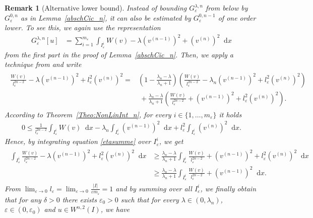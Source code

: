 \documentclass{article}
\newcommand{\dd}{\mathop{}\mathrm{d}} %
\newcommand{\lam}{\lambda}
\newcommand{\eps}{\varepsilon}
\numberwithin{figure}{section}
\newtheorem{rem}[theorem]{Remark}
\numberwithin{equation}{section}
\begin{document}
\begin{rem}[Alternative lower bound]
Instead of bounding $G^{\lam,n}_\eps$ from below by $G^{0,n}_\eps$ as in Lemma~\ref{abschCic_n}, it can also be estimated by $G^{0,n-1}_\eps$ of one order lower. To see this, we again use the representation
    \begin{align}
         G_\eps^{\lam,n}[u] & = \sum_{i=1}^{m_\eps} \int_{I_\eps^i}W(v) - \lam (v^{(n-1)})^2 + (v^{(n)})^2\dd x
    \end{align}
from the first part in the proof of Lemma~\ref{abschCic_n}. Then, we apply a technique from \cite[Section~4]{CheDalFonLeo} and write
    \begin{align} \label{etasumme}
    \begin{split}
        \frac{W(v)}{l_\eps^{2n-2}} - \lam(v^{(n-1)})^2+ l_\eps^2(v^{(n)})^2 = & \left(1-\frac{\lam_n-\lam}{\lam_n+1}\right) \! \left(\frac{W(v)}{l_\eps^{2n-2}}-\lam_n(v^{(n-1)})^2+l_\eps^2(v^{(n)})^2\right)\\
        &\ + \frac{\lam_n-\lam}{\lam_n+1} \left(\frac{W(v)}{l_\eps^{2n-2}} + (v^{(n-1)})^2+l_\eps^2(v^{(n)})^2\right).
    \end{split}
    \end{align}
According to Theorem~\ref{Theo:NonLinInt_n}, for every $i \in \{1,\ldots,m_\eps\}$ it holds
    \begin{align}
        0 \leq \frac{1}{l_\eps^{2n-2}} \int_{I_\eps^i} W(v)\dd x - \lam_n \int_{I_\eps^i} (v^{(n-1)})^2\dd x + l_\eps^2 \int_{I_\eps^i} (v^{(n)})^2\dd x.
    \end{align}
Hence, by integrating equation \eqref{etasumme} over $I_\eps^i$, we get
    \begin{align}
    \begin{split}
        \int_{I_\eps^i} \frac{W(v)}{l_\eps^{2n-2}} -\lam(v^{(n-1)})^2+ l_\eps^2 (v^{(n)})^2 \dd x 
        & \geq \frac{\lam_n-\lam}{\lam_n+1} \int_{I_\eps^i} \frac{W(v)}{l_\eps^{2n-2}} +(v^{(n-1)})^2+ l_\eps^2 (v^{(n)})^2\dd x \\
        &\geq \frac{\lam_n-\lam}{\lam_n+1} \int_{I_\eps^i} \frac{W(v)}{l_\eps^{2n-2}} + (v^{(n-1)})^2\dd x.
    \end{split}
    \end{align}
From $\lim_{\eps \to 0} l_\eps=\lim_{\eps \to 0} \frac{|I|}{\eps m_\eps} =1$ and by summing over all $I_\eps^i$, we finally obtain that for any $\delta > 0$ there exists $\eps_0 > 0$ such that for every $\lam \in (0, \lam_n)$, $\eps \in (0, \eps_0)$ and $u \in W^{n,2}(I)$, we have
    \begin{align}

\end{align}
\end{rem}
\end{document}
